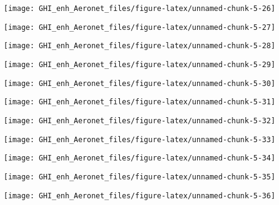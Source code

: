 \documentclass[
  10pt,
  a4paper,oneside]{article}
\begin{document}
\begin{center}\texttt{[image: GHI\_enh\_Aeronet\_files/figure-latex/unnamed-chunk-5-26]} \end{center}

\begin{center}\texttt{[image: GHI\_enh\_Aeronet\_files/figure-latex/unnamed-chunk-5-27]} \end{center}

\begin{center}\texttt{[image: GHI\_enh\_Aeronet\_files/figure-latex/unnamed-chunk-5-28]} \end{center}

\begin{center}\texttt{[image: GHI\_enh\_Aeronet\_files/figure-latex/unnamed-chunk-5-29]} \end{center}

\begin{center}\texttt{[image: GHI\_enh\_Aeronet\_files/figure-latex/unnamed-chunk-5-30]} \end{center}

\begin{center}\texttt{[image: GHI\_enh\_Aeronet\_files/figure-latex/unnamed-chunk-5-31]} \end{center}

\begin{center}\texttt{[image: GHI\_enh\_Aeronet\_files/figure-latex/unnamed-chunk-5-32]} \end{center}

\begin{center}\texttt{[image: GHI\_enh\_Aeronet\_files/figure-latex/unnamed-chunk-5-33]} \end{center}

\begin{center}\texttt{[image: GHI\_enh\_Aeronet\_files/figure-latex/unnamed-chunk-5-34]} \end{center}

\begin{center}\texttt{[image: GHI\_enh\_Aeronet\_files/figure-latex/unnamed-chunk-5-35]} \end{center}

\begin{center}\texttt{[image: GHI\_enh\_Aeronet\_files/figure-latex/unnamed-chunk-5-36]} \end{center}
\end{document}
